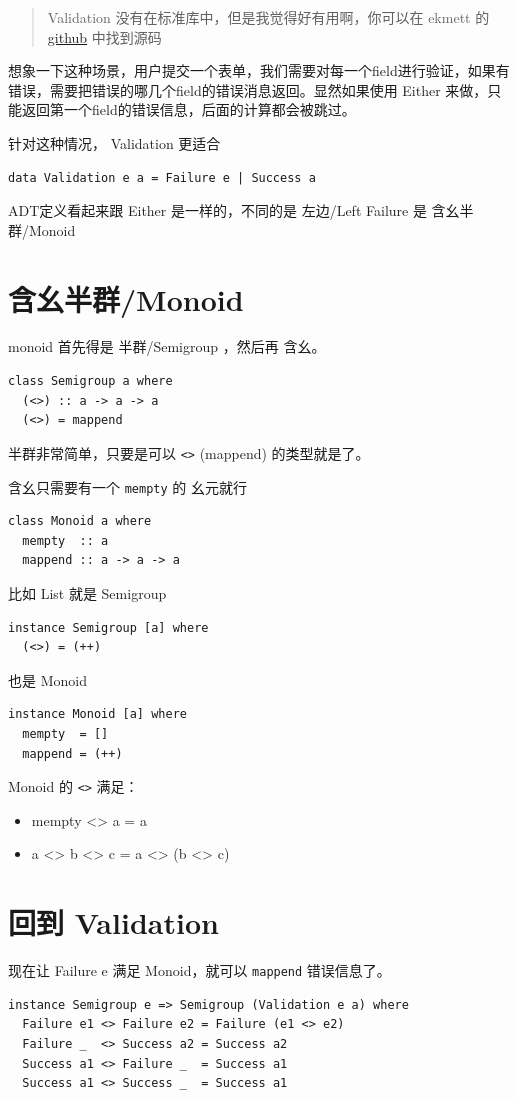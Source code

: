 \documentclass[11pt]{tufte-book}
\begin{document}
\begin{quote}
Validation 没有在标准库中，但是我觉得好有用啊，你可以在 ekmett 的 \href{https://github.com/ekmett/either}{github} 中找到源码
\end{quote}

想象一下这种场景，用户提交一个表单，我们需要对每一个field进行验证，如果有错误，需要把错误的哪几个field的错误消息返回。显然如果使用 Either 来做，只能返回第一个field的错误信息，后面的计算都会被跳过。

针对这种情况， Validation 更适合
\begin{verbatim}
data Validation e a = Failure e | Success a
\end{verbatim}

ADT定义看起来跟 Either 是一样的，不同的是 左边/Left Failure 是 含幺半群/Monoid

\section{含幺半群/Monoid}
\label{sec:orga56ba93}
monoid 首先得是 半群/Semigroup ，然后再 含幺。
\begin{verbatim}
class Semigroup a where
  (<>) :: a -> a -> a
  (<>) = mappend
\end{verbatim}

半群非常简单，只要是可以 \texttt{<>} (mappend) 的类型就是了。

含幺只需要有一个 \texttt{mempty} 的 幺元就行
\begin{verbatim}
class Monoid a where
  mempty  :: a
  mappend :: a -> a -> a
\end{verbatim}

比如 List 就是 Semigroup
\begin{verbatim}
instance Semigroup [a] where
  (<>) = (++)
\end{verbatim}
也是 Monoid
\begin{verbatim}
instance Monoid [a] where
  mempty  = []
  mappend = (++)
\end{verbatim}

Monoid 的 \texttt{<>} 满足：
\begin{itemize}
\item mempty <> a = a
\item a <> b <> c = a <> (b <> c)
\end{itemize}
\section{回到 Validation}
\label{sec:org653eaa8}
现在让 Failure e 满足 Monoid，就可以 \texttt{mappend} 错误信息了。
\begin{verbatim}
instance Semigroup e => Semigroup (Validation e a) where
  Failure e1 <> Failure e2 = Failure (e1 <> e2)
  Failure _  <> Success a2 = Success a2
  Success a1 <> Failure _  = Success a1
  Success a1 <> Success _  = Success a1
\end{verbatim}
\end{document}
